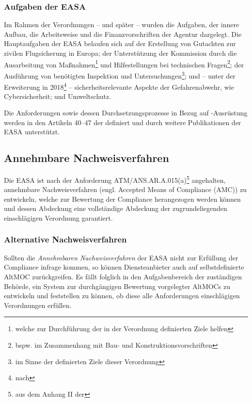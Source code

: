 \subsubsection{Aufgaben der EASA}

Im Rahmen der Verordnungen \textdagger{} -- und später  -- wurden die Aufgaben, der innere Aufbau, die Arbeitsweise und die Finanzvorschriften der Agentur dargelegt.
Die Hauptaufgaben der \ac{EASA} belaufen sich auf der Erstellung von Gutachten zur zivilen Flugsicherung in Europa; der Unterstützung der Kommission durch die Ausarbeitung von Maßnahmen\footnote{welche zur Durchführung der in der Verordnung definierten Ziele helfen} und Hilfestellungen bei technischen Fragen\footnote{bspw. im Zusammenhang mit Bau- und Konstruktionsvorschriften}; der Ausführung von benötigten Inspektion und Untersuchungen\footnote{im Sinne der definierten Ziele dieser Verordnung}; und -- unter der Erweiterung in 2018\footnote{nach } -- sicherheitsrelevante Aspekte der Gefahrenabwehr, wie Cybersicherheit; und Umweltschutz. \cite{2008R0216_summary, 2018R1139_summary}

Die Anforderungen sowie dessen Durchsetzungsprozesse in Bezug auf \atmans-Ausrüstung werden in den Artikeln 40--47 der  definiert und durch weitere Publikationen der \ac{EASA} unterstützt.
        
        \pagebreak

        \subsection{Annehmbare Nachweisverfahren}

        Die \ac{EASA} ist nach der Anforderung \textsf{ATM/ANS.AR.A.015(a)}\footnote{aus dem Anhang II der } angehalten, annehmbare Nachweisverfahren (engl. Accepted Means of Compliance (\acs{AMC})) zu entwickeln, welche zur Bewertung der Compliance herangezogen werden können und dessen Abdeckung eine vollständige Abdeckung der zugrundeliegenden einschlägigen Verordnung garantiert. 
        \cite[Anh. II]{2017R0373}

    \subsubsection{Alternative Nachweisverfahren}

        Sollten die \textit{Annehmbaren Nachweisverfahren} der \ac{EASA} nicht zur Erfüllung der Compliance infrage kommen, so können Diensteanbieter auch auf selbstdefinierte \acf{AltMOC} zurückgreifen.
        Es fällt folglich in den Aufgabenbereich der zuständigen Behörde, ein System zur durchgängigen Bewertung  vorgelegter \acp{AltMOC} zu entwickeln und feststellen zu können, ob diese alle Anforderungen einschlägigen Verordnungen erfüllen.
        \cite[Anh. II \textsf{ATM/ANS.AR.A.015(b-e)}]{2017R0373}
        
